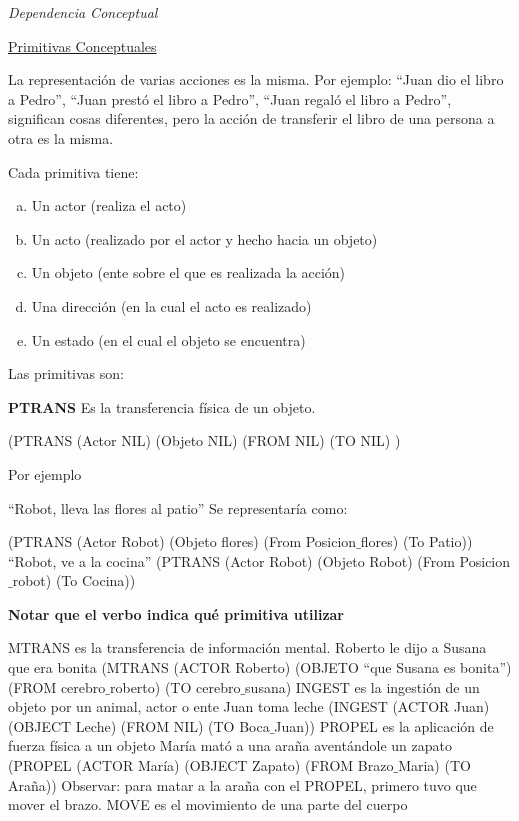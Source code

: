 \textit{Dependencia Conceptual}

\underline{Primitivas Conceptuales}

La representación de varias acciones es la misma.
Por ejemplo: “Juan dio el libro a Pedro”, “Juan prestó el libro a Pedro”, “Juan regaló el libro a Pedro”,
significan cosas diferentes, pero la acción de transferir el libro de una persona a otra es la misma.

Cada primitiva tiene:

\begin{enumerate}[a)]
	\item Un actor (realiza el acto)
	\item Un acto (realizado por el actor y hecho hacia un objeto)
	\item Un objeto (ente sobre el que es realizada la acción)
	\item Una dirección (en la cual el acto es realizado)
	\item Un estado (en el cual el objeto se encuentra)
\end{enumerate}

Las primitivas son:

\textbf{PTRANS} \hspace{0.5cm}
Es la transferencia física de un objeto. 

\hspace{2cm}
(PTRANS (Actor NIL) (Objeto NIL) (FROM NIL) (TO NIL) )

Por ejemplo

“Robot, lleva las flores al patio”
Se representaría como:

(PTRANS (Actor Robot) (Objeto flores) (From Posicion$\_$flores) (To Patio))
“Robot, ve a la cocina”
(PTRANS (Actor Robot) (Objeto Robot) (From Posicion$\_$robot) (To Cocina))

\textbf{Notar que el verbo indica qué primitiva utilizar}

MTRANS es la transferencia de información mental.
Roberto le dijo a Susana que era bonita
(MTRANS (ACTOR Roberto) (OBJETO “que Susana es bonita”) (FROM cerebro$\_$roberto) (TO
cerebro$\_$susana)
INGEST es la ingestión de un objeto por un animal, actor o ente
Juan toma leche
(INGEST (ACTOR Juan) (OBJECT Leche) (FROM NIL) (TO Boca$\_$Juan))
PROPEL es la aplicación de fuerza física a un objeto
María mató a una araña aventándole un zapato
(PROPEL (ACTOR María) (OBJECT Zapato) (FROM Brazo$\_$Maria) (TO Araña))
Observar: para matar a la araña con el PROPEL, primero tuvo que mover el brazo.
MOVE es el movimiento de una parte del cuerpo



